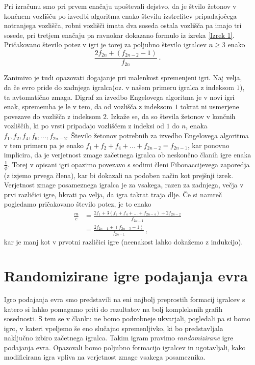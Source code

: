 \documentclass[twoside,11pt]{article}
\begin{document}
Pri izračunu smo pri prvem enačaju upoštevali dejstvo, da je štvilo žetonov v končnem vozlišču po izvedbi algoritma enako številu izstrelitev pripadajočega notranjega vozlišča, robni vozlišči imata dva soseda ostala vozlišča pa imajo tri sosede, pri tretjem enačaju pa ravnokar dokazano formulo iz izreka \ref{Izrek 1}.
Pričakovano število potez v igri je torej za poljubno število igralcev $n\ge3$ enako 
$$
\frac{2f_{2n} + (f_{2n-2}-1)}{f_{2n}} \ .
$$

Zanimivo je tudi opazovati dogajanje pri malenkost spremenjeni igri. Naj velja, da če evro pride 
do zadnjega igralca(oz. v našem primeru igralca z indeksom $1$), ta avtomatično zmaga. Digraf za izvedbo Engelovega algoritma je v novi igri enak, 
sprememba je le v tem, da od vozlišča z indeksom $1$ tokrat ni usmerjene povezave do vozlišča z indeksom $2$. 
Izkaže se, da so števila žetonov v končnih vozliščih, ki po vrsti pripadajo vozliščem z indeksi od $1$ 
do $n$, enaka $f_1,f_2,f_4,f_6,\ldots,f_{2n-2}$.
Število žetonov potrebnih za izvedbo Engelovega algoritma v tem primeru pa je enako $f_1+f_2+f_4+\ldots+f_{2n-2}=f_{2n-1}$, 
kar ponovno implicira, da je verjetnost zmage začetnega igralca ob neskončno članih igre enaka $\frac{1}{\phi}$. 
Torej v opisani igri opazimo povezavo s sodimi členi Fibonaccijevega zaporedja (z izjemo prvega člena), 
kar bi dokazali na podoben način kot prejšnji izrek.
Verjetnost zmage posameznega igralca je za vsakega, razen za zadnjega, večja v prvi različici igre, hkrati pa velja, da igra takrat traja dlje.
Če si namreč pogledamo pričakovano število potez, je to enako
\begin{align*}
    \frac{m}{c} &= \frac{2f_1 + 3(f_2+f_4+\ldots+f_{2n-4})+ 2f_{2n-2}}{f_{2n-1}} \\
    &= \frac{2f_{2n-1} + (f_{2n-3}-1)}{f_{2n-1}} \ ,
\end{align*}
kar je manj kot v prvotni različici igre (neenakost lahko dokažemo z indukcijo).

\section{Randomizirane igre podajanja evra}
Igro podajanja evra smo predstavili na eni najbolj preprostih formacij igralcev s katero si lahko pomagamo priti do rezultatov na bolj kompleksnih grafih sosednosti. 
S tem se v članku ne bomo podrobneje ukvarjali, pogledali pa si bomo igro, v kateri vpeljemo še eno slučajno spremenljivko, ki bo predstavljala naključno izbiro začetnega igralca. Takim
igram pravimo \emph{randomizirane} igre podajanja evra. Opazovali bomo poljubno formacijo igralcev in ugotavljali, kako modificirana igra vpliva na verjetnost zmage vsakega posameznika. 
\end{document}
